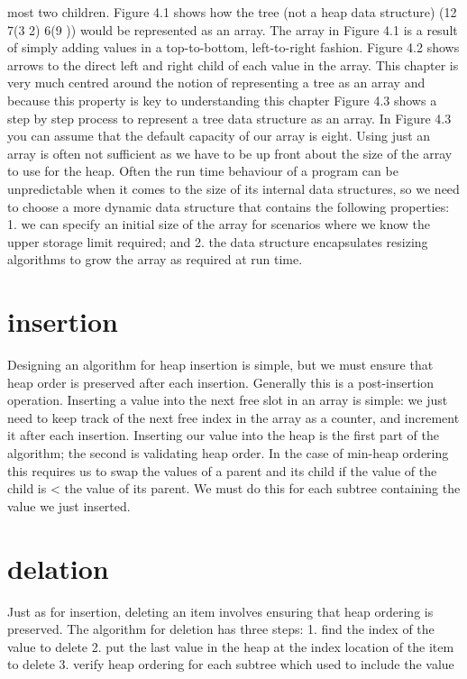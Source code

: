 \documentclass{article}
\begin{document}
most two children. Figure 4.1 shows how the tree (not a heap data structure)
(12 7(3 2) 6(9 )) would be represented as an array. The array in Figure 4.1 is a
result of simply adding values in a top-to-bottom, left-to-right fashion. Figure
4.2 shows arrows to the direct left and right child of each value in the array.
This chapter is very much centred around the notion of representing a tree as
an array and because this property is key to understanding this chapter Figure
4.3 shows a step by step process to represent a tree data structure as an array.
In Figure 4.3 you can assume that the default capacity of our array is eight.
Using just an array is often not sufficient as we have to be up front about the
size of the array to use for the heap. Often the run time behaviour of a program
can be unpredictable when it comes to the size of its internal data structures,
so we need to choose a more dynamic data structure that contains the following
properties:
1. we can specify an initial size of the array for scenarios where we know the
upper storage limit required; and
2. the data structure encapsulates resizing algorithms to grow the array as
required at run time.
\section*{insertion}\label{sec:inser} 

  Designing an algorithm for heap insertion is simple, but we must ensure that
heap order is preserved after each insertion. Generally this is a post-insertion
operation. Inserting a value into the next free slot in an array is simple: we just
need to keep track of the next free index in the array as a counter, and increment
it after each insertion. Inserting our value into the heap is the first part of the
algorithm; the second is validating heap order. In the case of min-heap ordering
this requires us to swap the values of a parent and its child if the value of the
child is < the value of its parent. We must do this for each subtree containing
the value we just inserted.
\section*{delation}\label{sec:dela} 

Just as for insertion, deleting an item involves ensuring that heap ordering is
preserved. The algorithm for deletion has three steps:
1. find the index of the value to delete
2. put the last value in the heap at the index location of the item to delete
3. verify heap ordering for each subtree which used to include the value
\end{document}
